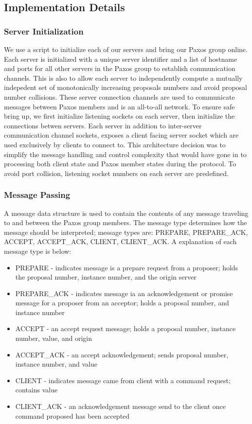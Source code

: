 \documentclass[11pt, onecolumn]{article}
\begin{document}
\subsection{Implementation Details}

\subsubsection{Server Initialization}

We use a script to initialize each of our servers and bring our Paxos group online.
Each server is initialized with a unique server identifier and a list of hostname and ports for all other servers in the Paxos group to establish communication channels.
This is also to allow each server to independently compute a mutually indepedent set of monotonically increasing proposals numbers and avoid proposal number collisions.
These server connection channels are used to communicate messages between Paxos members and is an all-to-all network.
To ensure safe bring up, we first initialize listening sockets on each server, then initialize the connections betwen servers.
Each server in addition to inter-server communication channel sockets, exposes a client facing server socket which are used exclusively by clients to connect to.
This architecture decision was to simplify the message handling and control complexity that would have gone in to processing both client state and Paxos member states during the protocol.
To avoid port collision, listening socket numbers on each server are predefined.

\subsubsection{Message Passing}

A message data structure is used to contain the contents of any message traveling to and between the Paxos group members.
The message type determines how the message should be interpreted; message types are: PREPARE, PREPARE\_ACK, ACCEPT, ACCEPT\_ACK, CLIENT, CLIENT\_ACK.
A explanation of each message type is below:
\begin{itemize}
\item PREPARE - indicates message is a prepare request from a proposer; holds the proposal number, instance number, and the origin server
\item PREPARE\_ACK - indicates message ia an acknowledgement or promise message for a proposer from an acceptor; holds a proposal number, and instance number
\item ACCEPT - an accept request message; holds a proposal number, instance number, value, and origin
\item ACCEPT\_ACK - an accept acknowledgement; sends proposal number, instance number, and value
\item CLIENT - indicates message came from client with a command request; contains value
\item CLIENT\_ACK - an acknowledgement message send to the client once command proposed has been accepted
\end{itemize}
\end{document}
